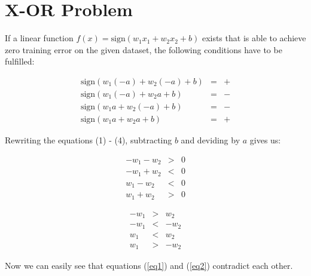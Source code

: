 \section*{X-OR Problem} 
If a linear function $f(x) = \text{sign}(w_1x_1 + w_2x_2+b)$ exists that is able to achieve zero training error on the given dataset, the following conditions have to be fulfilled:

\begin{eqnarray}
    \text{sign}(w_1(-a) + w_2(-a)+b)&=& +\\
    \text{sign}(w_1(-a) + w_2a+b)&=&-\\
    \text{sign}(w_1a + w_2(-a)+b)&=&-\\
    \text{sign}(w_1a + w_2a+b)&=&+
\end{eqnarray}

Rewriting the equations (1) - (4), subtracting $b$ and deviding by $a$ gives us:

\begin{eqnarray}
    -w_1- w_2 &>& 0\\
    -w_1 + w_2 &<& 0\\
    w_1- w_2&<& 0\\
    w_1 + w_2&>& 0
\end{eqnarray}

\begin{eqnarray}
    -w_1 &>& w_2\\ \label{eq1}
    -w_1 &<& - w_2\\\label{eq2}
    w_1&<& w_2\\
    w_1 &>& - w_2
\end{eqnarray}

Now we can easily see that equations (\ref{eq1}) and (\ref{eq2}) contradict each other.